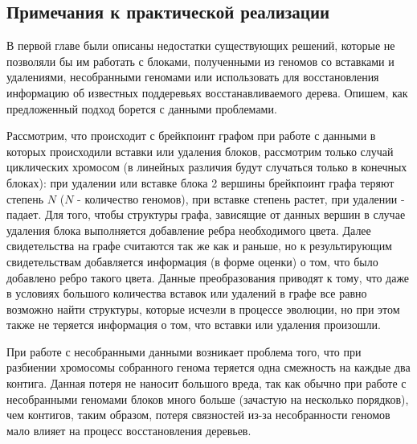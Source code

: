 \subsection{Примечания к практической реализации}

В первой главе были описаны недостатки существующих решений, которые не позволяли бы им работать с блоками, полученными из геномов со вставками
и удалениями, несобранными геномами или использовать для восстановления информацию об известных поддеревьях восстанавливаемого дерева.
Опишем, как предложенный подход борется с данными проблемами.

Рассмотрим, что происходит с брейкпоинт графом при работе с данными в которых происходили вставки или удаления блоков,
рассмотрим только случай циклических хромосом (в линейных различия будут случаться только в конечных блоках):
при удалении или вставке блока 2 вершины брейкпоинт графа теряют степень $N$ ($N$ - количество геномов), при вставке степень растет,
при удалении - падает.
Для того, чтобы  структуры графа, зависящие от данных вершин в случае удаления блока выполняется добавление  ребра
необходимого цвета.
Далее свидетельства на графе считаются так же как и раньше, но к результирующим свидетельствам добавляется информация (в форме оценки) о том,
что было добавлено ребро такого цвета.
Данные преобразования приводят к тому, что даже в условиях большого количества вставок или удалений в графе все равно возможно найти
структуры, которые исчезли в процессе эволюции, но при этом также не теряется информация о том, что вставки или удаления произошли.

При работе с несобранными данными возникает проблема того, что при разбиении хромосомы собранного генома теряется одна смежность на каждые
два контига.
Данная потеря не наносит большого вреда, так как обычно при работе с несобранными геномами блоков много больше (зачастую на несколько порядков),
чем контигов, таким образом, потеря связностей из-за несобранности геномов мало влияет на процесс восстановления деревьев.

